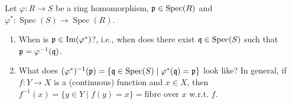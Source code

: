 \begin{question}
    Let $\varphi: R \to S$ be a ring homomorphism, $\mathfrak{p} \in \operatorname{Spec}(R)$ and $\varphi^*: \operatorname{Spec}(S) \to \operatorname{Spec}(R)$.
    \begin{enumerate}
        \item When is $\mathfrak{p} \in \operatorname{Im}(\varphi^*)$?, i.e., when does there exist $\mathfrak{q} \in \operatorname{Spec}(S)$ such that $\mathfrak{p}  = \varphi^{-1}(\mathfrak{q})$.
        \item What does $(\varphi^*)^{-1}(\mathfrak{p}) = \{\mathfrak{q} \in \operatorname{Spec}(S) \mid \varphi^*(\mathfrak{q}) = \mathfrak{p}\}$ look like? In general, if $f: Y \to X$ is a (continuous) function and $x \in X$, then $f^{-1}(x) = \{y \in Y \mid f(y) = x\} = \text{fibre over $x$ w.r.t. $f$}$.
    \end{enumerate}
\end{question}

